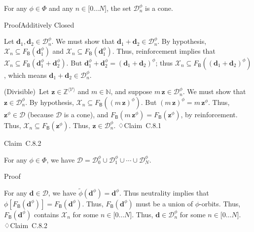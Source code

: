\documentclass[
]{article}
\begin{document}
For any \(\phi \in \Phi\) and any \(n \in \lbrack 0\ldots N\rbrack\),
the set \(\mathcal{D}_{n}^{\phi}\) is a cone.

ProofAdditively Closed

Let \(\mathbf{d}_{1},\mathbf{d}_{2} \in \mathcal{D}_{n}^{\phi}\). We
must show that
\(\mathbf{d}_{1} + \mathbf{d}_{2} \in \mathcal{D}_{n}^{\phi}\). By
hypothesis,
\(\mathcal{X}_{n} \subseteq F_{\mathsf{B}}\left( \mathbf{d}_{1}^{\phi} \right)\)
and
\(\mathcal{X}_{n} \subseteq F_{\mathsf{B}}\left( \mathbf{d}_{1}^{\phi} \right)\).
Thus, reinforcement implies that
\(\mathcal{X}_{n} \subseteq F_{\mathsf{B}}\left( \mathbf{d}_{1}^{\phi} + \mathbf{d}_{2}^{\phi} \right)\).
But
\(\mathbf{d}_{1}^{\phi} + \mathbf{d}_{2}^{\phi} = \left( \mathbf{d}_{1} + \mathbf{d}_{2} \right)^{\phi}\);
thus
\(\mathcal{X}_{n} \subseteq F_{\mathsf{B}}\left( \left( \mathbf{d}_{1} + \mathbf{d}_{2} \right)^{\phi} \right)\),
which means
\(\mathbf{d}_{1} + \mathbf{d}_{2} \in \mathcal{D}_{n}^{\phi}\).

(Divisible)~Let
\(\mathbf{z} \in \mathbb{Z}^{\langle\mathcal{V}\rangle}\) and
\(m \in \mathbb{N}\), and suppose
\(m\,\mathbf{z} \in \mathcal{D}_{n}^{\phi}\). We must show that
\(\mathbf{z} \in \mathcal{D}_{n}^{\phi}\). By hypothesis,
\(\mathcal{X}_{n} \subseteq F_{\mathsf{B}}\left( \left( m\,\mathbf{z} \right)^{\phi} \right)\).
But \(\left( m\,\mathbf{z} \right)^{\phi} = m\,\mathbf{z}^{\phi}\).
Thus, \(\mathbf{z}^{\phi} \in \mathcal{D}\) (because \(\mathcal{D}\) is
a cone), and
\(F_{\mathsf{B}}\left( m\,\mathbf{z}^{\phi} \right) = F_{\mathsf{B}}\left( \mathbf{z}^{\phi} \right)\),
by reinforcement. Thus,
\(\mathcal{X}_{n} \subseteq F_{\mathsf{B}}\left( \mathbf{z}^{\phi} \right)\).
Thus, \(\mathbf{z} \in \mathcal{D}_{n}^{\phi}\). ♢Claim~C.8.1

Claim~C.8.2

For any \(\phi \in \Phi\), we have
\(\mathcal{D} = \mathcal{D}_{0}^{\phi} \cup \mathcal{D}_{1}^{\phi} \cup \cdots \cup \mathcal{D}_{N}^{\phi}\).

Proof

For any \(\mathbf{d} \in \mathcal{D}\), we have
\(\widetilde{\phi}\left( \mathbf{d}^{\phi} \right) = \mathbf{d}^{\phi}\).
Thus neutrality implies that
\(\phi\left\lbrack F_{\mathsf{B}}\left( \mathbf{d}^{\phi} \right) \right\rbrack = F_{\mathsf{B}}\left( \mathbf{d}^{\phi} \right)\).
Thus, \(F_{\mathsf{B}}\left( \mathbf{d}^{\phi} \right)\) must be a union
of \(\phi\)-orbits. Thus,
\(F_{\mathsf{B}}\left( \mathbf{d}^{\phi} \right)\) contains
\(\mathcal{X}_{n}\) for some \(n \in \lbrack 0\ldots N\rbrack\). Thus,
\(\mathbf{d} \in \mathcal{D}_{n}^{\phi}\) for some
\(n \in \lbrack 0\ldots N\rbrack\). ♢Claim~C.8.2
\end{document}

